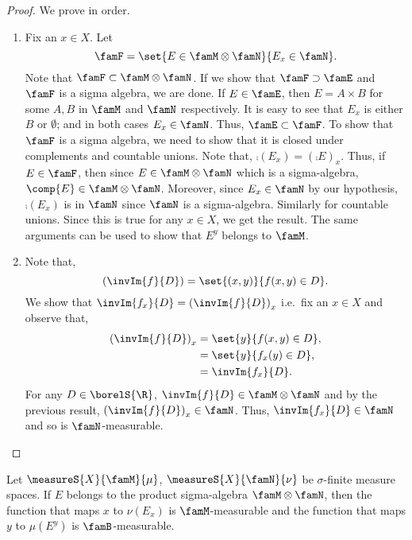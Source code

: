 \begin{proof}
    We prove in order.
    \begin{enumerate}
	\item
	    Fix an $x \in X$.
	    Let \[\famF = \set{E\in\famM\otimes\famN}{E_x \in \famN}.\]
	    Note that $\famF \subset \famM\otimes\famN$. If we show that $\famF \supset \famE$ and $\famF$ is
	    a sigma algebra, we are done.
	    If $E \in \famE$, then $E = A \times B$ for some $A,B$ in $\famM$ and $\famN$ respectively. It is
	    easy to see that $E_x$ is either $B$ or $\emptyset$; and in both cases $E_x \in \famN$. Thus,
	    $\famE \subset \famF$. To show that $\famF$ is a sigma algebra, we need to show that it is closed
	    under complements and countable unions. Note that,
	    $\comp{(E_x)} = {(\comp{E})}_{x}$. Thus, if $E \in \famF$, then since $E \in \famM\otimes\famN$
	    which is a sigma-algebra, $\comp{E} \in \famM\otimes\famN$. Moreover, since $E_x \in \famN$ by
	    our hypothesis, $\comp{(E_x)}$ is in $\famN$ since $\famN$ is a sigma-algebra. Similarly for
	    countable unions. Since this is true for any $x \in X$, we get the result. The same arguments can
	    be used to show that $E^{y}$ belongs to $\famM$.
	\item
	    Note that,
	    \[{(\invIm{f}{D})} = \set{(x,y)}{f(x,y)\in D}.\]
	    We show that $\invIm{f_x}{D} = {(\invIm{f}{D})}_{x}$ i.e.~fix an $x \in X$ and
	    observe that,
	    \begin{equation*}
		\begin{aligned}
		    {(\invIm{f}{D})}_{x} &= \set{y}{f(x,y)\in D},\\
		    &= \set{y}{f_x(y) \in D},\\
		    &= \invIm{f_x}{D}.
		\end{aligned}
	    \end{equation*}
	    For any $D \in \borelS{\R}$, $\invIm{f}{D} \in \famM\otimes\famN$ and by the previous result,
	    ${(\invIm{f}{D})}_{x} \in \famN$. Thus, $\invIm{f_x}{D} \in \famN$ and so is $\famN$-measurable.
    \end{enumerate}
\end{proof}
\begin{Proposition}\label{prop:Lemma_prod_meas}
    Let $\measureS{X}{\famM}{\mu}$, $\measureS{X}{\famN}{\nu}$ be $\sigma$-finite measure spaces. If $E$
    belongs to the product sigma-algebra $\famM\otimes\famN$, then the function that maps $x$ to $\nu(E_x)$
    is $\famM$-measurable and the function that maps $y$ to $\mu(E^{y})$ is $\famB$-measurable.
\end{Proposition}
